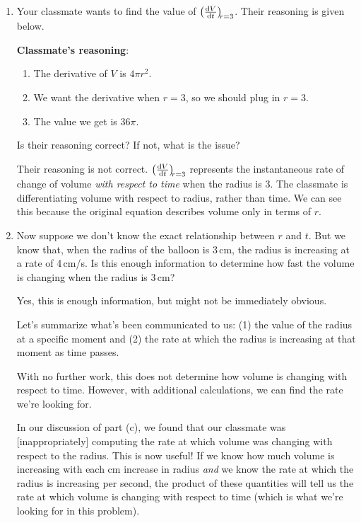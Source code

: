 \documentclass[main]{subfiles}
\begin{document}
\begin{enumerate}
\begin{enumerate}
\item
\begin{problem}
Your classmate wants to find the value of $\diff{V}{t}[r=3]$. Their reasoning is given below.

\textbf{Classmate's reasoning}: 
\begin{enumerate}
    \item The derivative of $V$ is $4\pi r^2$.
    \item We want the derivative when $r=3$, so we should plug in $r=3$.
    \item The value we get is $36\pi$. 
\end{enumerate}

Is their reasoning correct? If not, what is the issue?
\end{problem}
\pspace{\vfill}

\begin{solution}
    Their reasoning is not correct. $\diff{V}{t}[r=3]$ represents the instantaneous rate of change of volume \emph{with respect to time} when the radius is 3. The classmate is differentiating volume with respect to radius, rather than time. We can see this because the original equation describes volume only in terms of $r$.
\end{solution}

\item 
\begin{problem}
Now suppose we don't know the exact relationship between $r$ and $t$. But we know that, when the radius of the balloon is 3\,cm, the radius is increasing at a rate of 4\,cm/s. Is this enough information to determine how fast the volume is changing when the radius is 3\,cm?
\end{problem}
\pspace{\vfill}

\begin{solution}
    Yes, this is enough information, but might not be immediately obvious.
    
    Let's summarize what's been communicated to us: (1) the value of the radius at a specific moment and (2) the rate at which the radius is increasing at that moment as time passes. 
    
    With no further work, this does not determine how volume is changing with respect to time. However, with additional calculations, we can find the rate we're looking for. 
    
    In our discussion of part (c), we found that our classmate was [inappropriately] computing the rate at which volume was changing with respect to the radius. This is now useful!  If we know how much volume is increasing with each cm increase in radius \emph{and} we know the rate at which the radius is increasing per second, the product of these quantities will tell us the rate at which volume is changing with respect to time (which is what we're looking for in this problem).
    

\end{solution}
\end{enumerate}
\end{enumerate}
\end{document}
